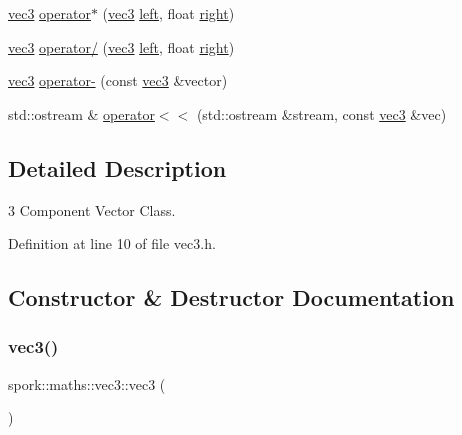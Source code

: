 \begin{DoxyCompactItemize}
\item 
\hyperlink{structspork_1_1maths_1_1vec3}{vec3} \hyperlink{structspork_1_1maths_1_1vec3_affd23437583b3ab1d0c1e3004c3cecfe}{operator$\ast$} (\hyperlink{structspork_1_1maths_1_1vec3}{vec3} \hyperlink{structspork_1_1maths_1_1vec3_a7aa9b70355b9a0d4a30372c0d2e4b05a}{left}, float \hyperlink{structspork_1_1maths_1_1vec3_ab70b578c5f09ed3323ce8159a3e243a4}{right})
\item 
\hyperlink{structspork_1_1maths_1_1vec3}{vec3} \hyperlink{structspork_1_1maths_1_1vec3_a20e5a67b725a828200ca2ea765ce8ac1}{operator/} (\hyperlink{structspork_1_1maths_1_1vec3}{vec3} \hyperlink{structspork_1_1maths_1_1vec3_a7aa9b70355b9a0d4a30372c0d2e4b05a}{left}, float \hyperlink{structspork_1_1maths_1_1vec3_ab70b578c5f09ed3323ce8159a3e243a4}{right})
\item 
\hyperlink{structspork_1_1maths_1_1vec3}{vec3} \hyperlink{structspork_1_1maths_1_1vec3_aeb9e3850f1202f9e51cc869dcf3a62b7}{operator-\/} (const \hyperlink{structspork_1_1maths_1_1vec3}{vec3} \&vector)
\item 
std\+::ostream \& \hyperlink{structspork_1_1maths_1_1vec3_aadd73ce1bc8619c0a69cf9f9c0810819}{operator$<$$<$} (std\+::ostream \&stream, const \hyperlink{structspork_1_1maths_1_1vec3}{vec3} \&vec)
\end{DoxyCompactItemize}


\subsection{Detailed Description}
3 Component Vector Class. 

Definition at line 10 of file vec3.\+h.



\subsection{Constructor \& Destructor Documentation}
\mbox{\label{structspork_1_1maths_1_1vec3_ac62b81dad4278a33b9109cf01fb41de7}} 
\subsubsection{\texorpdfstring{vec3()}{vec3()}\hspace{0.1cm}{\footnotesize\ttfamily [1/3]}}
{\footnotesize\ttfamily spork\+::maths\+::vec3\+::vec3 (\begin{DoxyParamCaption}{ }\end{DoxyParamCaption})}



